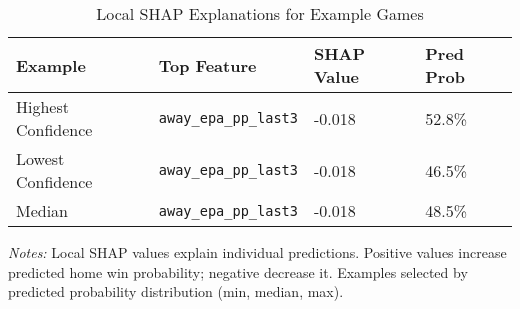 \begin{table}[htbp]
\centering
\caption{Local SHAP Explanations for Example Games}
\label{tab:shap-local-examples}
\begin{threeparttable}
\begin{tabularx}{\linewidth}{@{}lYYY@{}}
\toprule
 \textbf{Example} & \textbf{Top Feature} & \textbf{SHAP Value} & \textbf{Pred Prob} \\
\midrule
Highest Confidence & \texttt{away{\_}epa{\_}pp{\_}last3} & -0.018 & 52.8\% \\
Lowest Confidence & \texttt{away{\_}epa{\_}pp{\_}last3} & -0.018 & 46.5\% \\
Median & \texttt{away{\_}epa{\_}pp{\_}last3} & -0.018 & 48.5\% \\
\bottomrule
\end{tabularx}
\begin{tablenotes}[flushleft]
\footnotesize
\item \textit{Notes:} Local SHAP values explain individual predictions. Positive values increase predicted home win probability; negative decrease it. Examples selected by predicted probability distribution (min, median, max).
\end{tablenotes}
\end{threeparttable}
\end{table}
